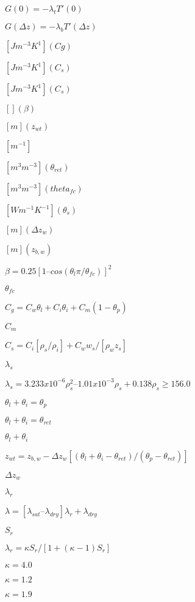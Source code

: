 \documentclass{article}
\begin{document}
{$G(0) = - \lambda_t T'(0)$
\pagebreak

$G(\Delta z) = - \lambda_b T'(\Delta z)$
\pagebreak

$[J m^{-3} K^{1}] (Cg)$
\pagebreak

$[J m^{-3} K^1] (C_s)$
\pagebreak

$[J m^{-3} K^{1}] (C_s)$
\pagebreak

$[ ] (\beta)$
\pagebreak

$[m] (z_{wt})$
\pagebreak

$[m^{-1}]$
\pagebreak

$[m^3 m^{-3}] (\theta_{ret})$
\pagebreak

$[m^3 m^{-3}] (theta_{fc})$
\pagebreak

$[W m^{-1} K^{-1}] (\theta_s)$
\pagebreak

$[m] (\Delta z_w)$
\pagebreak

$[m] (z_{b,w})$
\pagebreak

$\beta = 0.25 [1 – cos(\theta_l \pi / \theta_{fc})]^2$
\pagebreak

$\theta_{fc}$
\pagebreak

$C_g = C_w \theta_l + C_i \theta_i + C_m(1 - \theta_p)$
\pagebreak

$C_m$
\pagebreak

$C_s = C_i [\rho_s /\rho_i ] + C_w w_s /[\rho_w z_s]$
\pagebreak

$\lambda_s$
\pagebreak

$\lambda_s = 3.233 x 10^{-6} \rho_s^2 – 1.01 x 10^{-3} \rho_s + 0.138 \rho_s \geq 156.0 $
\pagebreak

$\theta_l + \theta_i = \theta_p$
\pagebreak

$\theta_l + \theta_i = \theta_{ret}$
\pagebreak

$\theta_l + \theta_i$
\pagebreak

$z_{wt} = z_{b,w} - \Delta z_w [(\theta_l + \theta_i - \theta_{ret})/(\theta_p - \theta_{ret})]$
\pagebreak

$\Delta z_w$
\pagebreak

$\lambda_r$
\pagebreak

$\lambda = [ \lambda_{sat} – \lambda_{dry} ] \lambda_r + \lambda_{dry}$
\pagebreak

$S_r$
\pagebreak

$\lambda_r = \kappa S_r/[1 + (\kappa-1) S_r ]$
\pagebreak

$\kappa = 4.0$
\pagebreak

$\kappa = 1.2$
\pagebreak

$\kappa = 1.9$
\pagebreak

}
\end{document}

